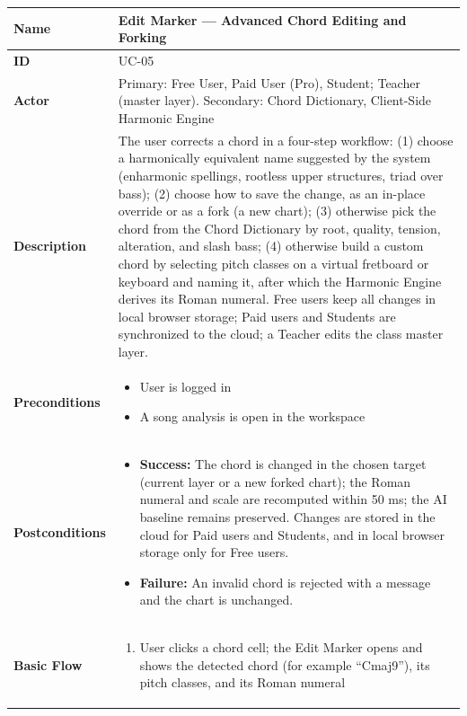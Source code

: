 \documentclass[a4paper]{article}
\newlength{\ucLeft}
\begin{document}
\begin{longtable}{|>{\bfseries}p{\ucLeft}|p{\dimexpr\linewidth-\ucLeft-2\tabcolsep-2\arrayrulewidth}|}
\hline
Name & Edit Marker --- Advanced Chord Editing and Forking \\ \hline
ID & UC-05 \\ \hline
Actor & Primary: Free User, Paid User (Pro), Student; Teacher (master layer). Secondary: Chord Dictionary, Client-Side Harmonic Engine \\ \hline
Description & The user corrects a chord in a four-step workflow: (1) choose a harmonically equivalent name suggested by the system (enharmonic spellings, rootless upper structures, triad over bass); (2) choose how to save the change, as an in-place override or as a fork (a new chart); (3) otherwise pick the chord from the Chord Dictionary by root, quality, tension, alteration, and slash bass; (4) otherwise build a custom chord by selecting pitch classes on a virtual fretboard or keyboard and naming it, after which the Harmonic Engine derives its Roman numeral. Free users keep all changes in local browser storage; Paid users and Students are synchronized to the cloud; a Teacher edits the class master layer. \\ \hline
Preconditions &
\begin{itemize}[leftmargin=1em, nosep, topsep=2pt, partopsep=0pt, parsep=0pt, after=\strut]
    \item User is logged in
    \item A song analysis is open in the workspace
\end{itemize}
\\ \hline
Postconditions &
\begin{itemize}[leftmargin=1em, nosep, topsep=2pt, partopsep=0pt, parsep=0pt, after=\strut]
    \item \textbf{Success:} The chord is changed in the chosen target (current layer or a new forked chart); the Roman numeral and scale are recomputed within 50 ms; the AI baseline remains preserved. Changes are stored in the cloud for Paid users and Students, and in local browser storage only for Free users.
    \item \textbf{Failure:} An invalid chord is rejected with a message and the chart is unchanged.
\end{itemize}
\\ \hline
Basic Flow &
\begin{enumerate}[leftmargin=1.5em, nosep, topsep=2pt, partopsep=0pt, parsep=0pt, after=\strut]
    \item User clicks a chord cell; the Edit Marker opens and shows the detected chord (for example ``Cmaj9''), its pitch classes, and its Roman numeral

\end{enumerate}
\end{longtable}
\end{document}
